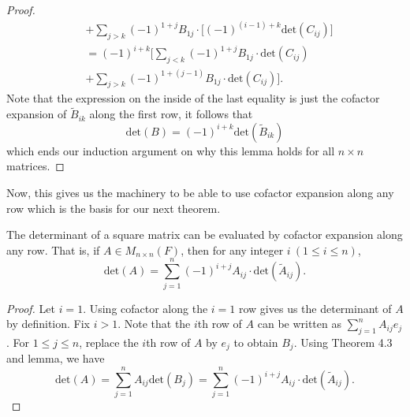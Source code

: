 \begin{proof}
\begin{align*}
                      &+ \sum_{ j > k  }^{  } (-1)^{1+j} {B}_{1j} \cdot  \Big[ (-1)^{(i-1) + k } \text{det}({C}_{ij})\Big] \\
                      &=  (-1)^{i+k} \Bigg[ \sum_{ j < k  }^{  } (-1)^{1 + j} {B}_{1j} \cdot \text{det}({C}_{ij}) \\ 
                      &+ \sum_{ j > k  }^{  } (-1)^{1 + (j-1)}  {B}_{1j} \cdot \text{det}({C}_{ij})\Bigg].
    \end{align*}
    Note that the expression on the inside of the last equality is just the cofactor expansion of \( {\tilde{B}}_{ik} \) along the first row, it follows that
    \[  \text{det}(B) = (-1)^{i + k} \text{det}({\tilde{B}}_{ik}) \]
    which ends our induction argument on why this lemma holds for all \( n \times n  \) matrices.
\end{proof}

Now, this gives us the machinery to be able to use cofactor expansion along any row which is the basis for our next theorem.

\begin{theorem}\label{Theorem 4.4}
    The determinant of a square matrix can be evaluated by cofactor expansion along any row. That is, if \( A \in {M}_{n \times n}(F) \), then for any integer \( i \ (1 \leq i \leq n ) \), 
    \[  \text{det}(A) = \sum_{ j=1 }^{ n } (-1)^{i +j} {A}_{ij} \cdot \text{det}({\tilde{A}}_{ij}). \]
\end{theorem}
\begin{proof}
Let \( i = 1  \). Using cofactor along the \( i = 1  \) row gives us the determinant of \( A  \) by definition. Fix \( i > 1  \). Note that the \( i  \)th row of \( A  \) can be written as \( \sum_{ j=1  }^{ n } {A}_{ij} {e}_{j} \). For \( 1 \leq j \leq n  \), replace the \( i \)th row of \( A  \) by \( {e}_{j} \) to obtain \( {B}_{j} \). Using Theorem 4.3 and lemma, we have 
\[  \text{det}(A) = \sum_{ j=1 }^{ n } {A}_{ij} \text{det}({B}_{j}) = \sum_{ j=1 }^{ n } (-1)^{i +j} {A}_{ij} \cdot \text{det}({\tilde{A}}_{ij}). \]
\end{proof}

